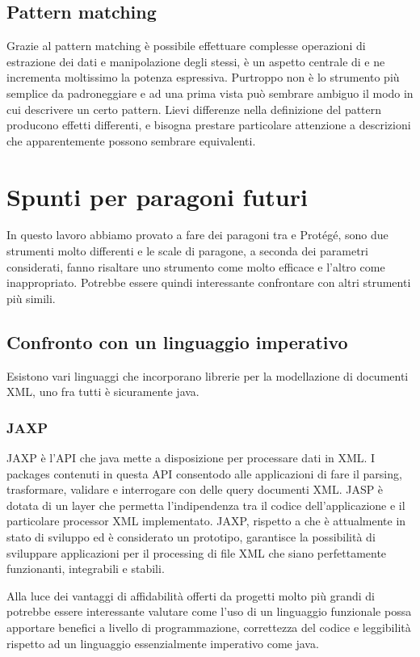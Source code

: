 \subsection{Pattern matching}
Grazie al pattern matching è possibile effettuare complesse operazioni di estrazione dei dati e manipolazione degli stessi, è un aspetto centrale di \cduce e ne incrementa moltissimo la potenza espressiva. Purtroppo non è lo strumento più semplice da padroneggiare e ad una prima vista può sembrare ambiguo il modo in cui descrivere un certo pattern. Lievi differenze nella definizione del pattern producono effetti differenti, e bisogna prestare particolare attenzione a descrizioni che apparentemente possono sembrare equivalenti.
\section{Spunti per paragoni futuri}
In questo lavoro abbiamo provato a fare dei paragoni tra \cduce e Protégé, sono due strumenti molto differenti e le scale di paragone, a seconda dei parametri considerati, fanno risaltare uno strumento come molto efficace e l'altro come inappropriato. Potrebbe essere quindi interessante confrontare \cduce con altri strumenti più simili.
\subsection{Confronto con un linguaggio imperativo}
Esistono vari linguaggi che incorporano librerie per la modellazione di documenti XML, uno fra tutti è sicuramente java.
\subsubsection{JAXP}
JAXP\cite{JAXP} è l'API che java mette a disposizione per processare dati in XML. I packages contenuti in questa API consentodo alle applicazioni di fare il parsing, trasformare, validare e interrogare con delle query documenti XML. JASP è dotata di un layer che permetta l'indipendenza tra il codice dell'applicazione e il particolare processor XML implementato. JAXP, rispetto a \cduce che è attualmente in stato di sviluppo ed è considerato un prototipo, garantisce la possibilità di sviluppare applicazioni per il processing di file XML che siano perfettamente funzionanti, integrabili e stabili.

Alla luce dei vantaggi di affidabilità offerti da progetti molto più grandi di \cduce potrebbe essere interessante valutare come l'uso di un linguaggio funzionale possa apportare benefici a livello di programmazione, correttezza del codice e leggibilità rispetto ad un linguaggio essenzialmente imperativo come java.
